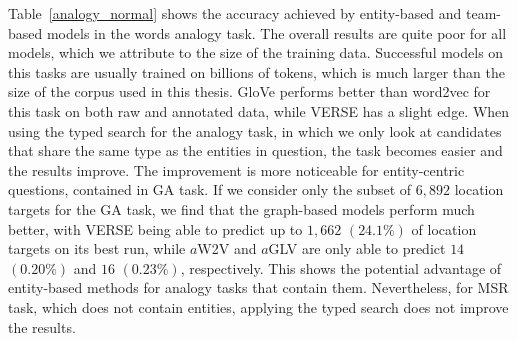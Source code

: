 Table~\ref{analogy_normal} shows the accuracy achieved by entity-based and team-based models in the words analogy task. The overall results are quite poor for all models, which we attribute to the size of the training data. Successful models on this tasks are usually trained on billions of tokens, which is much larger than the size of the corpus used in this thesis. GloVe performs better than word2vec for this task on both raw and annotated data, while VERSE has a slight edge. When using the typed search for the analogy task, in which we only look at candidates that share the same type as the entities in question, the task becomes easier and the results improve. The improvement is more noticeable for entity-centric questions, contained in GA task. If we consider only the subset of $6,892$ location targets for the GA task, we find that the graph-based models perform much better, with VERSE being able to predict up to $1,662$ $(24.1\%)$ of location targets on its best run, while $a$W2V and $a$GLV are only able to predict $14$ $(0.20\%)$ and $16$ $(0.23\%)$, respectively. This shows the potential advantage of entity-based methods for analogy tasks that contain them. Nevertheless, for MSR task, which does not contain entities, applying the typed search does not improve the results. 
\begin{table}[t]
\caption{Word analogy results. Shown is the prediction accuracy for the normal analogy tasks and the variation where predictions are limited to the correct entity type. The best two values per task and variation are highlighted.}
\label{analogy_normal}
\setlength{\tabcolsep}{2pt} %
\renewcommand{\arraystretch}{1.0} %
\end{table}

